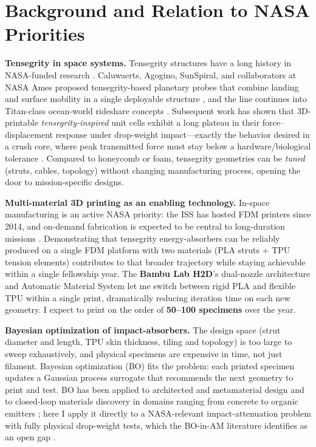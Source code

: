 \documentclass[11pt]{article}
\begin{document}
\section{Background and Relation to NASA Priorities}

\textbf{Tensegrity in space systems.} Tensegrity structures have a long
history in NASA-funded research \citep{skelton2009tensegrity,sultan2009tensegrity}.
Caluwaerts, Agogino, SunSpiral, and collaborators at
NASA Ames proposed tensegrity-based planetary probes that combine landing and
surface mobility in a single deployable structure
\citep{caluwaerts2014superball,agogino2018superball,sabelhaus2015system,vespignani2018design},
and the line continues into Titan-class ocean-world rideshare concepts
\citep{deitrich2022titan}.  Subsequent work has shown that 3D-printable
\emph{tensegrity-inspired} unit cells exhibit a long
plateau in their force--displacement response under drop-weight impact---exactly
the behavior desired in a crush core, where peak transmitted force must stay
below a hardware/biological tolerance \citep{pajunen2019design}.  Compared
to honeycomb or foam, tensegrity
geometries can be \emph{tuned} (struts, cables, topology) without changing
manufacturing process, opening the door to mission-specific designs.

\textbf{Multi-material 3D printing as an enabling technology.}  In-space
manufacturing is an active NASA priority: the ISS has hosted FDM printers
since 2014, and on-demand fabrication is expected to be central to long-duration
missions \citep{prater2019summary}.  Demonstrating that tensegrity
energy-absorbers can be reliably produced on a single FDM platform with two
materials (PLA struts + TPU tension elements) contributes to that
broader trajectory while staying achievable within a single fellowship year.
The \textbf{Bambu Lab H2D}'s dual-nozzle architecture and Automatic Material
System let me switch between rigid PLA and flexible TPU within a single
print, dramatically reducing iteration time on each new geometry.  I expect
to print on the order of \textbf{50--100 specimens} over the year.

\textbf{Bayesian optimization of impact-absorbers.}  The design space (strut
diameter and length, TPU skin thickness, tiling and topology) is too large to
sweep exhaustively, and physical specimens are expensive in time, not just
filament.  Bayesian optimization (BO) \citep{shahriari2016taking,frazier2018tutorial,zhang2021bo}
fits the problem: each printed specimen updates a Gaussian process surrogate
that recommends the next geometry to print and test.  BO has been
applied to architected and metamaterial design \citep{mo2023accelerated,zhang2021bo}
and to closed-loop materials discovery in domains ranging from concrete
\citep{ament2023sustainable} to organic emitters
\citep{striethkalthoff2024delocalized}; here I apply it directly to a
NASA-relevant impact-attenuation problem with fully physical drop-weight tests,
which the BO-in-AM literature identifies as an open gap \citep{zhang2021bo}.
\end{document}
